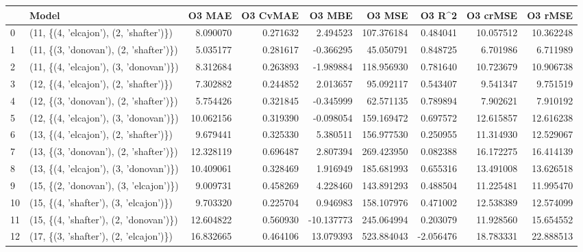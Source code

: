 \begin{tabular}{llrrrrrrr}
\toprule
{} &                                   Model &     O3 MAE &  O3 CvMAE &     O3 MBE &      O3 MSE &    O3 R\textasciicircum2 &   O3 crMSE &    O3 rMSE \\
\midrule
0  &  (11, \{(4, 'elcajon'), (2, 'shafter')\}) &   8.090070 &  0.271632 &   2.494523 &  107.376184 &  0.484041 &  10.057512 &  10.362248 \\
1  &  (11, \{(3, 'donovan'), (2, 'shafter')\}) &   5.035177 &  0.281617 &  -0.366295 &   45.050791 &  0.848725 &   6.701986 &   6.711989 \\
2  &  (11, \{(4, 'elcajon'), (3, 'donovan')\}) &   8.312684 &  0.263893 &  -1.989884 &  118.956930 &  0.781640 &  10.723679 &  10.906738 \\
3  &  (12, \{(4, 'elcajon'), (2, 'shafter')\}) &   7.302882 &  0.244852 &   2.013657 &   95.092117 &  0.543407 &   9.541347 &   9.751519 \\
4  &  (12, \{(3, 'donovan'), (2, 'shafter')\}) &   5.754426 &  0.321845 &  -0.345999 &   62.571135 &  0.789894 &   7.902621 &   7.910192 \\
5  &  (12, \{(4, 'elcajon'), (3, 'donovan')\}) &  10.062156 &  0.319390 &  -0.098054 &  159.169472 &  0.697572 &  12.615857 &  12.616238 \\
6  &  (13, \{(4, 'elcajon'), (2, 'shafter')\}) &   9.679441 &  0.325330 &   5.380511 &  156.977530 &  0.250955 &  11.314930 &  12.529067 \\
7  &  (13, \{(3, 'donovan'), (2, 'shafter')\}) &  12.328119 &  0.696487 &   2.807394 &  269.423950 &  0.082388 &  16.172275 &  16.414139 \\
8  &  (13, \{(4, 'elcajon'), (3, 'donovan')\}) &  10.409061 &  0.328469 &   1.916949 &  185.681993 &  0.655316 &  13.491008 &  13.626518 \\
9  &  (15, \{(2, 'donovan'), (3, 'elcajon')\}) &   9.009731 &  0.458269 &   4.228460 &  143.891293 &  0.488504 &  11.225481 &  11.995470 \\
10 &  (15, \{(4, 'shafter'), (3, 'elcajon')\}) &   9.703320 &  0.225704 &   0.946983 &  158.107976 &  0.471002 &  12.538389 &  12.574099 \\
11 &  (15, \{(4, 'shafter'), (2, 'donovan')\}) &  12.604822 &  0.560930 & -10.137773 &  245.064994 &  0.203079 &  11.928560 &  15.654552 \\
12 &  (17, \{(3, 'shafter'), (2, 'elcajon')\}) &  16.832665 &  0.464106 &  13.079393 &  523.884043 & -2.056476 &  18.783331 &  22.888513 \\

\end{tabular}
